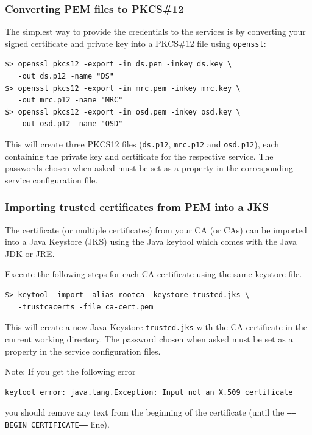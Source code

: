 \documentclass[a4paper,10pt]{book}
\begin{document}
\subsubsection{Converting PEM files to PKCS\#12}
The simplest way to provide the credentials to the services is by converting your signed certificate and private key into a PKCS\#12 file using \texttt{openssl}:


\begin{verbatim}
$> openssl pkcs12 -export -in ds.pem -inkey ds.key \
   -out ds.p12 -name "DS"
$> openssl pkcs12 -export -in mrc.pem -inkey mrc.key \
   -out mrc.p12 -name "MRC"
$> openssl pkcs12 -export -in osd.pem -inkey osd.key \
   -out osd.p12 -name "OSD"
\end{verbatim}


This will create three PKCS12 files (\texttt{ds.p12}, \texttt{mrc.p12} and \texttt{osd.p12}), each containing the private key and certificate for the respective service. The passwords chosen when asked must be set as a property in the corresponding service configuration file.


\subsubsection{Importing trusted certificates from PEM into a JKS}

The certificate (or multiple certificates) from your CA (or CAs) can be imported into a Java Keystore (JKS)  using the Java keytool which comes with the Java JDK or JRE.

Execute the following steps for each CA certificate using the same keystore file.


\begin{verbatim}
$> keytool -import -alias rootca -keystore trusted.jks \
   -trustcacerts -file ca-cert.pem
\end{verbatim}


This will create a new Java Keystore \texttt{trusted.jks} with the CA certificate in the current working directory. The password chosen when asked must be set as a property in the service configuration files.

Note: If you get the following error
\begin{verbatim}
keytool error: java.lang.Exception: Input not an X.509 certificate
\end{verbatim}
you should remove any text from the beginning of the certificate (until the \texttt{-----BEGIN CERTIFICATE-----} line).
\end{document}
